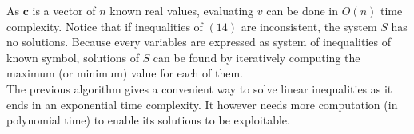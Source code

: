 \documentclass{article}
\begin{document}
\begin{appendices}
            As $\textbf{c}$ is a vector of $n$ known real values, evaluating $v$ can be done in $O(n)$ time complexity.
            Notice that if inequalities of $(14)$ are inconsistent, the system $S$ has no solutions. 
            Because every variables are expressed as system of inequalities of known symbol, solutions of $S$ 
            can be found by iteratively computing the maximum (or minimum) value for each of them.\\
            The previous algorithm gives a convenient way to solve linear inequalities as it ends in an exponential time complexity.
            It however needs more computation (in polynomial time) to enable its solutions to be exploitable.\\
            \\\
            

    \end{appendices}

    
\end{document}
